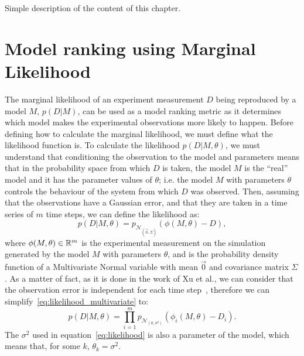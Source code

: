 {\color{blue} Simple description of the content of this chapter}.

\section{Model ranking using Marginal Likelihood}
The marginal likelihood of an experiment measurement $D$ being 
reproduced by a model $M$, $p (D | M)$, can be used as a model ranking 
metric as it determines which model makes the experimental observations 
more likely to happen. Before defining how to calculate the marginal 
likelihood, we must define what the likelihood function is. To calculate 
the likelihood $p (D | M, \theta)$, we must understand that conditioning 
the observation to the model and parameters means that in 
the probability space from which $D$ is taken, the model $M$ is the 
``real'' model and it has the parameter values of $\theta$; i.e. the 
model $M$ with parameters $\theta$ controls the behaviour of the system 
from which $D$ was observed. Then, assuming that the observations have a 
Gaussian error, and that they are taken in a time series of $m$ time 
steps, we can define the likelihood as:
\begin{equation}
    p (D | M, \theta) = p_{\mathcal{N}_{\left(\vec{0}, \Sigma\right)}}
        (\phi (M,\theta) - D),
\label{eq:likelihood_multivariate}
\end{equation}
where $\phi (M, \theta) \in \mathbb{R}^m$ is the experimental measurement 
on the simulation generated by the model $M$ with parameters $\theta$,
and  is the 
probability density function of a Multivariate Normal variable with mean 
$\vec{0}$ and covariance matrix $\Sigma$. As a matter of fact, as it is
done in the work of Xu et al., we can consider that the observation 
error is independent for each time step~\cite{Xura20}, therefore we can 
simplify~\ref{eq:likelihood_multivariate} to:
\begin{equation}
    p (D | M, \theta) = \prod_{i = 1}^m p_{\mathcal{N}_{\left(0, 
        \sigma^2\right)}} (\phi_i (M,\theta) - D_i).
\label{eq:likelihood}
\end{equation}
The $\sigma^2$ used in equation~\ref{eq:likelihood} is also a parameter
of the model, which means that, for some $k$, $\theta_k = \sigma^2$.

